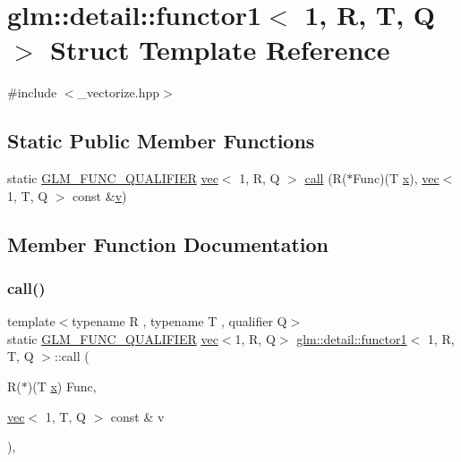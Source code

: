 \hypertarget{structglm_1_1detail_1_1functor1_3_011_00_01_r_00_01_t_00_01_q_01_4}{}\section{glm\+:\+:detail\+:\+:functor1$<$ 1, R, T, Q $>$ Struct Template Reference}
\label{structglm_1_1detail_1_1functor1_3_011_00_01_r_00_01_t_00_01_q_01_4}


{\ttfamily \#include $<$\+\_\+vectorize.\+hpp$>$}

\subsection*{Static Public Member Functions}
\begin{DoxyCompactItemize}
\item 
static \hyperlink{setup_8hpp_a33fdea6f91c5f834105f7415e2a64407}{G\+L\+M\+\_\+\+F\+U\+N\+C\+\_\+\+Q\+U\+A\+L\+I\+F\+I\+ER} \hyperlink{structglm_1_1vec}{vec}$<$ 1, R, Q $>$ \hyperlink{structglm_1_1detail_1_1functor1_3_011_00_01_r_00_01_t_00_01_q_01_4_ab729a87fa4a02c97b5cfaadd1000488c}{call} (R($\ast$Func)(T \hyperlink{_s_d_l__opengl_8h_ad0e63d0edcdbd3d79554076bf309fd47}{x}), \hyperlink{structglm_1_1vec}{vec}$<$ 1, T, Q $>$ const \&\hyperlink{_s_d_l__opengl_8h_a10a82eabcb59d2fcd74acee063775f90}{v})
\end{DoxyCompactItemize}


\subsection{Member Function Documentation}
\mbox{\label{structglm_1_1detail_1_1functor1_3_011_00_01_r_00_01_t_00_01_q_01_4_ab729a87fa4a02c97b5cfaadd1000488c}} 
\subsubsection{\texorpdfstring{call()}{call()}}
{\footnotesize\ttfamily template$<$typename R , typename T , qualifier Q$>$ \\
static \hyperlink{setup_8hpp_a33fdea6f91c5f834105f7415e2a64407}{G\+L\+M\+\_\+\+F\+U\+N\+C\+\_\+\+Q\+U\+A\+L\+I\+F\+I\+ER} \hyperlink{structglm_1_1vec}{vec}$<$1, R, Q$>$ \hyperlink{structglm_1_1detail_1_1functor1}{glm\+::detail\+::functor1}$<$ 1, R, T, Q $>$\+::call (\begin{DoxyParamCaption}\item[{R($\ast$)(T \hyperlink{_s_d_l__opengl_8h_ad0e63d0edcdbd3d79554076bf309fd47}{x})}]{Func,  }\item[{\hyperlink{structglm_1_1vec}{vec}$<$ 1, T, Q $>$ const \&}]{v }\end{DoxyParamCaption})\hspace{0.3cm}{\ttfamily [inline]}, {\ttfamily [static]}}



